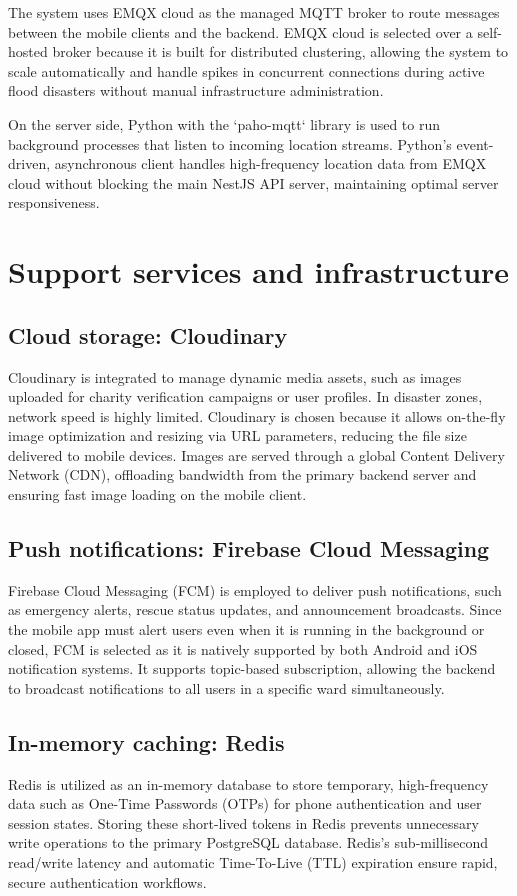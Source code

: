 \documentclass[../Main.tex]{subfiles}
\begin{document}
The system uses EMQX cloud \cite{emqxwebsite} as the managed MQTT broker to route messages between the mobile clients and the backend. EMQX cloud is selected over a self-hosted broker because it is built for distributed clustering, allowing the system to scale automatically and handle spikes in concurrent connections during active flood disasters without manual infrastructure administration.

On the server side, Python with the `paho-mqtt` \cite{pahomqttwebsite} library is used to run background processes that listen to incoming location streams. Python's event-driven, asynchronous client handles high-frequency location data from EMQX cloud without blocking the main NestJS API server, maintaining optimal server responsiveness.

\section{Support services and infrastructure}

\subsection{Cloud storage: Cloudinary}
Cloudinary \cite{cloudinarywebsite} is integrated to manage dynamic media assets, such as images uploaded for charity verification campaigns or user profiles. In disaster zones, network speed is highly limited. Cloudinary is chosen because it allows on-the-fly image optimization and resizing via URL parameters, reducing the file size delivered to mobile devices. Images are served through a global Content Delivery Network (CDN), offloading bandwidth from the primary backend server and ensuring fast image loading on the mobile client.

\subsection{Push notifications: Firebase Cloud Messaging}
Firebase Cloud Messaging (FCM) \cite{firebasefcmwebsite} is employed to deliver push notifications, such as emergency alerts, rescue status updates, and announcement broadcasts. Since the mobile app must alert users even when it is running in the background or closed, FCM is selected as it is natively supported by both Android and iOS notification systems. It supports topic-based subscription, allowing the backend to broadcast notifications to all users in a specific ward simultaneously.

\subsection{In-memory caching: Redis}
Redis \cite{rediswebsite} is utilized as an in-memory database to store temporary, high-frequency data such as One-Time Passwords (OTPs) for phone authentication and user session states. Storing these short-lived tokens in Redis prevents unnecessary write operations to the primary PostgreSQL database. Redis's sub-millisecond read/write latency and automatic Time-To-Live (TTL) expiration ensure rapid, secure authentication workflows.
\end{document}
